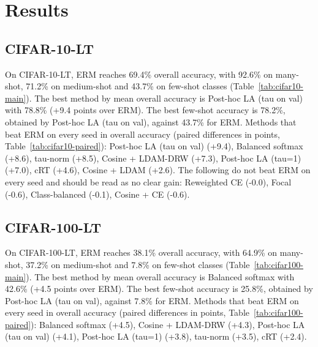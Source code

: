 \section{Results}
\subsection{CIFAR-10-LT}
On CIFAR-10-LT, ERM reaches 69.4\% overall accuracy, with 92.6\% on many-shot, 71.2\% on medium-shot and 43.7\% on few-shot classes (Table~\ref{tab:cifar10-main}). The best method by mean overall accuracy is Post-hoc LA (tau on val) with 78.8\% (+9.4 points over ERM). The best few-shot accuracy is 78.2\%, obtained by Post-hoc LA (tau on val), against 43.7\% for ERM. Methods that beat ERM on every seed in overall accuracy (paired differences in points, Table~\ref{tab:cifar10-paired}): Post-hoc LA (tau on val) (+9.4), Balanced softmax (+8.6), tau-norm (+8.5), Cosine + LDAM-DRW (+7.3), Post-hoc LA (tau=1) (+7.0), cRT (+4.6), Cosine + LDAM (+2.6). The following do not beat ERM on every seed and should be read as no clear gain: Reweighted CE (-0.0), Focal (-0.6), Class-balanced (-0.1), Cosine + CE (-0.6). 

\begin{table}[t]\centering\small
\caption{CIFAR-10-LT, imbalance 100. Test accuracy (\%), mean $\pm$ std over 3 seeds; bold = best mean.}\label{tab:cifar10-main}
\end{table}
\begin{table}[t]\centering\small
\caption{CIFAR-10-LT: paired difference against ERM of the same seed (percentage points).}\label{tab:cifar10-paired}
\end{table}
\subsection{CIFAR-100-LT}
On CIFAR-100-LT, ERM reaches 38.1\% overall accuracy, with 64.9\% on many-shot, 37.2\% on medium-shot and 7.8\% on few-shot classes (Table~\ref{tab:cifar100-main}). The best method by mean overall accuracy is Balanced softmax with 42.6\% (+4.5 points over ERM). The best few-shot accuracy is 25.8\%, obtained by Post-hoc LA (tau on val), against 7.8\% for ERM. Methods that beat ERM on every seed in overall accuracy (paired differences in points, Table~\ref{tab:cifar100-paired}): Balanced softmax (+4.5), Cosine + LDAM-DRW (+4.3), Post-hoc LA (tau on val) (+4.1), Post-hoc LA (tau=1) (+3.8), tau-norm (+3.5), cRT (+2.4). 

